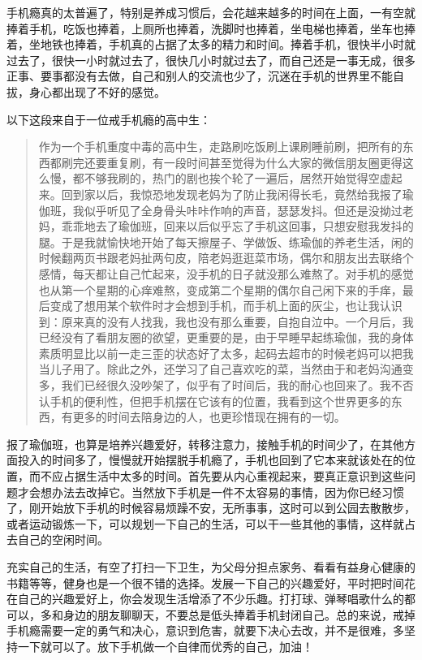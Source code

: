 手机瘾真的太普遍了，特别是养成习惯后，会花越来越多的时间在上面，一有空就捧着手机，吃饭也捧着，上厕所也捧着，洗脚时也捧着，坐电梯也捧着，坐车也捧着，坐地铁也捧着，手机真的占据了太多的精力和时间。捧着手机，很快半小时就过去了，很快一小时就过去了，很快几小时就过去了，而自己还是一事无成，很多正事、要事都没有去做，自己和别人的交流也少了，沉迷在手机的世界里不能自拔，身心都出现了不好的感觉。

以下这段来自于一位戒手机瘾的高中生：

\begin{quote}
    作为一个手机重度中毒的高中生，走路刷吃饭刷上课刷睡前刷，把所有的东西都刷完还要重复刷，有一段时间甚至觉得为什么大家的微信朋友圈更得这么慢，都不够我刷的，热门的剧也挨个轮了一遍后，居然开始觉得空虚起来。回到家以后，我惊恐地发现老妈为了防止我闲得长毛，竟然给我报了瑜伽班，我似乎听见了全身骨头咔咔作响的声音，瑟瑟发抖。但还是没拗过老妈，乖乖地去了瑜伽班，回来以后似乎忘了手机这回事，只想安慰我发抖的腿。于是我就愉快地开始了每天擦屋子、学做饭、练瑜伽的养老生活，闲的时候翻两页书跟老妈扯两句皮，陪老妈逛逛菜市场，偶尔和朋友出去联络个感情，每天都让自己忙起来，没手机的日子就没那么难熬了。对手机的感觉也从第一个星期的心痒难熬，变成第二个星期的偶尔自己闲下来的手痒，最后变成了想用某个软件时才会想到手机，而手机上面的灰尘，也让我认识到：原来真的没有人找我，我也没有那么重要，自抱自泣中。一个月后，我已经没有了看朋友圈的欲望，更重要的是，由于早睡早起练瑜伽，我的身体素质明显比以前一走三歪的状态好了太多，起码去超市的时候老妈可以把我当儿子用了。除此之外，还学习了自己喜欢吃的菜，当然由于和老妈沟通变多，我们已经很久没吵架了，似乎有了时间后，我的耐心也回来了。我不否认手机的便利性，但把手机摆在它该有的位置，我看到这个世界更多的东西，有更多的时间去陪身边的人，也更珍惜现在拥有的一切。
\end{quote}

报了瑜伽班，也算是培养兴趣爱好，转移注意力，接触手机的时间少了，在其他方面投入的时间多了，慢慢就开始摆脱手机瘾了，手机也回到了它本来就该处在的位置，而不应占据生活中太多的时间。首先要从内心重视起来，要真正意识到这些问题才会想办法去改掉它。当然放下手机是一件不太容易的事情，因为你已经习惯了，刚开始放下手机的时候容易烦躁不安，无所事事，这时可以到公园去散散步，或者运动锻炼一下，可以规划一下自己的生活，可以干一些其他的事情，这样就占去自己的空闲时间。

充实自己的生活，有空了打扫一下卫生，为父母分担点家务、看看有益身心健康的书籍等等，健身也是一个很不错的选择。发展一下自己的兴趣爱好，平时把时间花在自己的兴趣爱好上，你会发现生活增添了不少乐趣。打打球、弹琴唱歌什么的都可以，多和身边的朋友聊聊天，不要总是低头捧着手机封闭自己。总的来说，戒掉手机瘾需要一定的勇气和决心，意识到危害，就要下决心去改，并不是很难，多坚持一下就可以了。放下手机做一个自律而优秀的自己，加油！


